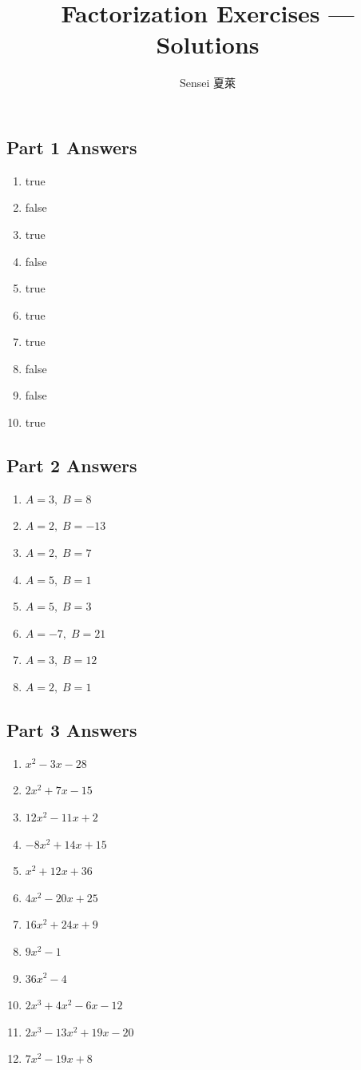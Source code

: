 \documentclass[12pt,a4paper]{article}
\title{Factorization Exercises --- Solutions}
\author{Sensei \textperiodcentered 夏萊}
\date{}
\begin{document}
	\maketitle
	\subsection*{Part 1 Answers}
	\begin{enumerate}
		\item true
		\item false
		\item true
		\item false
		\item true
		\item true
		\item true
		\item false
		\item false
		\item true
	\end{enumerate}
	\subsection*{Part 2 Answers}
	\begin{enumerate}
		\item $A=3,\; B=8$
		\item $A=2,\; B=-13$
		\item $A=2,\; B=7$
		\item $A=5,\; B=1$
		\item $A=5,\; B=3$
		\item $A=-7,\; B=21$
		\item $A=3,\; B=12$
		\item $A=2,\; B=1$
	\end{enumerate}
	\subsection*{Part 3 Answers}
	\begin{enumerate}
		\item $x^2-3x-28$
		\item $2x^2+7x-15$
		\item $12x^2-11x+2$
		\item $-8x^2+14x+15$
		\item $x^2+12x+36$
		\item $4x^2-20x+25$
		\item $16x^2+24x+9$
		\item $9x^2-1$
		\item $36x^2-4$
		\item $2x^3+4x^2-6x-12$
		\item $2x^3-13x^2+19x-20$
		\item $7x^2-19x+8$
	\end{enumerate}
\end{document}
